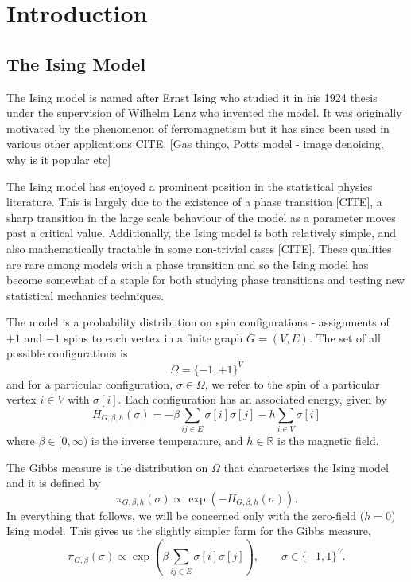 \chapter{Introduction}
\label{Ch:CouplingIntro}



\section{The Ising Model}
\label{sec:Ising}
	The Ising model is named after Ernst Ising who studied it in his 1924 thesis \cite{Ising1925-nd} under the supervision of Wilhelm Lenz who invented the model. It was originally motivated by the phenomenon of ferromagnetism but it has since been used in various other applications CITE. [Gas thingo, Potts model - image denoising, why is it popular etc]

	The Ising model has enjoyed a prominent position in the statistical physics literature. This is largely due to the existence of a phase transition [CITE], a sharp transition in the large scale behaviour of the model as a parameter moves past a critical value. Additionally, the Ising model is both relatively simple, and also mathematically tractable in some non-trivial cases [CITE]. These qualities are rare among models with a phase transition and so the Ising model has become somewhat of a staple for both studying phase transitions and testing new statistical mechanics techniques.

	The model is a probability distribution on spin configurations - assignments of $+1$ and $-1$ spins to each vertex in a finite graph $G = (V, E)$. The set of all possible configurations is
	\begin{equation}
		\Omega = \{-1, +1\}^V
	\end{equation}
	and for a particular configuration, $\sigma \in \Omega$, we refer to the spin of a particular vertex $i \in V$ with $\sigma[i]$. Each configuration has an associated energy, given by 
	\begin{equation}
		H_{G, \beta, h}(\sigma) = -\beta \sum_{ij \in E} \sigma[i] \sigma[j] - h\sum_{i \in V} \sigma[i]
	\end{equation}
	where $\beta \in [0, \infty)$ is the inverse temperature, and $h \in \mathbb{R}$ is the magnetic field. 

	The Gibbs measure is the distribution on $\Omega$ that characterises the Ising model and it is defined by
	\begin{equation}
		\pi_{G, \beta, h}(\sigma) \propto \exp(-H_{G, \beta, h}(\sigma)).
		\label{eq:gibbsmeasurefull}
	\end{equation}
	In everything that follows, we will be concerned only with the zero-field ($h = 0$) Ising model. This gives us the slightly simpler form for the Gibbs measure,
	\begin{equation}
		\pi_{G, \beta}(\sigma) \propto \exp \left( \beta \sum_{ij \in E} \sigma[i] \sigma[j] \right), \qquad \sigma \in \{-1, 1\}^V.
		\label{eq:gibbsmeasure}
	\end{equation}

